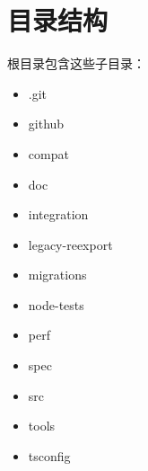 \section{目录结构}


根目录包含这些子目录：

\begin{itemize}
  \item .git
  \item github
  \item compat
  \item doc
  \item integration
  \item legacy-reexport
  \item migrations
  \item node-tests
  \item perf
  \item spec
  \item src
  \item tools
  \item tsconfig
\end{itemize}



